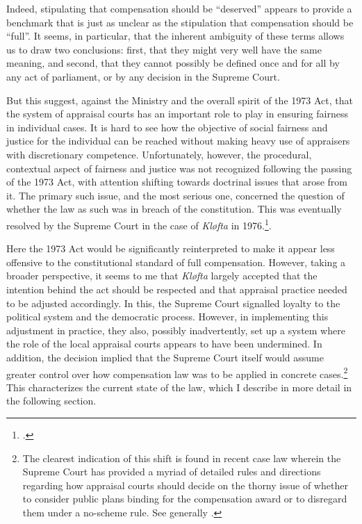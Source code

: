Indeed, stipulating that compensation should be ``deserved'' appears to provide a benchmark that is just as unclear as the stipulation that compensation should be ``full''. It seems, in particular, that the inherent ambiguity of these terms allows us to draw two conclusions: first, that they might very well have the same meaning, and second, that they cannot possibly be defined once 
and for all by any act of parliament, or by any decision in the Supreme Court.

But this suggest, against the Ministry and the overall spirit of the 1973 Act, that the system of appraisal courts has an important role to play in ensuring fairness in individual cases. It is hard to see how the objective of social fairness and justice for the individual can be reached without making heavy use of appraisers with discretionary competence. Unfortunately, however, the procedural, contextual aspect of fairness and justice was not recognized following the passing of the 1973 Act, with attention shifting towards doctrinal issues that arose from it. The primary such issue, and the most serious one, concerned the question of whether the law as such was in breach of the constitution. This was eventually resolved by the Supreme Court in the case of \emph{Kløfta} in 1976.\footnote{\cite{klofta76}.}. 

Here the 1973 Act would be significantly reinterpreted to make it appear less offensive to the constitutional standard of full compensation. However, taking a broader perspective, it seems to me that \emph{Kløfta} largely accepted that the intention behind the act should be respected and that appraisal practice needed to be adjusted accordingly. In this, the Supreme Court signalled loyalty to the political system and the democratic process. However, in implementing this adjustment in practice, they also, possibly inadvertently, set up a system where the role of the local appraisal courts appears to have been undermined. In addition, the decision implied that the Supreme Court itself would assume greater control over how compensation law was to be applied in concrete cases.\footnote{The clearest indication of this shift is found in recent case law wherein the Supreme Court has provided a myriad of detailed rules and directions regarding how appraisal courts should decide on the thorny issue of whether to consider public plans binding for the compensation award or to disregard them under a no-scheme rule. See generally \cite[7-9]{nou03}.} This characterizes the current state of the law, which I describe in more detail in the following section.


